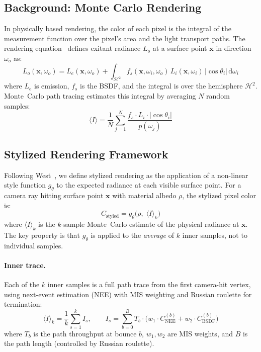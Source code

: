 \documentclass{article}
\begin{document}
\subsection{Background: Monte Carlo Rendering}
\label{sec:mc}

In physically based rendering, the color of each pixel is the integral of the measurement function over the pixel's area and the light transport paths. The rendering equation~\cite{kajiya1986rendering} defines exitant radiance $L_o$ at a surface point $\mathbf{x}$ in direction $\omega_o$ as:
\begin{equation}
    L_o(\mathbf{x}, \omega_o) = L_e(\mathbf{x}, \omega_o) + \int_{\mathcal{H}^2} f_s(\mathbf{x}, \omega_i, \omega_o)\, L_i(\mathbf{x}, \omega_i)\, |\cos\theta_i|\, \mathrm{d}\omega_i
    \label{eq:rendering}
\end{equation}
where $L_e$ is emission, $f_s$ is the BSDF, and the integral is over the hemisphere $\mathcal{H}^2$. Monte~Carlo path tracing estimates this integral by averaging $N$ random samples:
\begin{equation}
    \langle I \rangle = \frac{1}{N} \sum_{j=1}^{N} \frac{f_s \cdot L_i \cdot |\cos\theta_i|}{p(\omega_j)}
    \label{eq:mc_estimate}
\end{equation}


\subsection{Stylized Rendering Framework}
\label{sec:framework}

Following West~\cite{west2024stylized}, we define stylized rendering as the application of a non-linear style function $g_\theta$ to the expected radiance at each visible surface point. For a camera ray hitting surface point $\mathbf{x}$ with material albedo $\rho$, the stylized pixel color is:
\begin{equation}
    C_{\text{styled}} = g_\theta\!\bigl(\rho,\; \langle I \rangle_k\bigr)
    \label{eq:stylized}
\end{equation}
where $\langle I \rangle_k$ is the $k$-sample Monte~Carlo estimate of the physical radiance at $\mathbf{x}$. The key property is that $g_\theta$ is applied to the \emph{average} of $k$ inner samples, not to individual samples.

\paragraph{Inner trace.} Each of the $k$ inner samples is a full path trace from the first camera-hit vertex, using next-event estimation (NEE) with MIS weighting and Russian roulette for termination:
\begin{equation}
    \langle I \rangle_k = \frac{1}{k} \sum_{s=1}^{k} I_s, \qquad I_s = \sum_{b=0}^{B} T_b \cdot \bigl(w_1 \cdot C_{\text{NEE}}^{(b)} + w_2 \cdot C_{\text{BSDF}}^{(b)}\bigr)
    \label{eq:inner_trace}
\end{equation}
where $T_b$ is the path throughput at bounce $b$, $w_1, w_2$ are MIS weights, and $B$ is the path length (controlled by Russian roulette).
\end{document}

